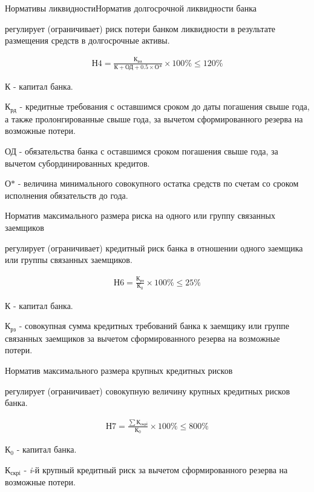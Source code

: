 \documentclass[_Banking_p2.tex]{subfiles}
\begin{document}
\begin{frame}[shrink=15]{Нормативы ликвидности}{Норматив долгосрочной ликвидности банка}
\begin{block}
\quad
регулирует (ограничивает) риск потери банком ликвидности в результате размещения средств в долгосрочные активы.
\end{block}
\begin{align}
\text{Н4}=\frac{\text{К}_\text{рд}}{\text{К}+\text{ОД}+	0.5\times \text{О*}}\times 100\%\leq 120\%
\end{align}

$\text{К}$ - капитал банка.

$\text{К}_\text{рд}$ - кредитные требования с оставшимся сроком до даты погашения свыше года, а также пролонгированные свыше года, за вычетом сформированного резерва на возможные потери.

$\text{ОД}$ - обязательства банка с оставшимся сроком погашения свыше года, за вычетом субординированных кредитов.

$\text{О*}$ - величина минимального совокупного остатка средств по счетам со сроком исполнения обязательств до года.
\end{frame}

\begin{frame}[shrink=15]{\setfontsize{14pt} Норматив максимального размера риска на одного или группу связанных заемщиков}
\begin{block}
\quad
регулирует (ограничивает) кредитный риск банка в отношении одного заемщика или группы связанных заемщиков.
\end{block}
\begin{align}
\text{Н6}=\frac{\text{К}_\text{рз}}{\text{К}_0}\times 100\%\leq 25\%
\end{align}

$\text{К}$ - капитал банка.

$\text{К}_\text{рз}$ - совокупная сумма кредитных требований банка к заемщику или группе связанных заемщиков за вычетом сформированного резерва на возможные потери.
\end{frame}

\begin{frame}{Норматив максимального размера крупных кредитных рисков}
\begin{block}
\quad
регулирует (ограничивает) совокупную величину крупных кредитных рисков банка. 
\end{block}
\begin{align}
\text{Н7}=\frac{\sum \text{К}_\text{скрi}}{\text{К}_0}\times 100\%\leq 800\%\end{align}

$\text{К}_0$ - капитал банка.

$\text{К}_\text{скрi}$ - \textit{i}-й крупный кредитный риск за вычетом сформированного резерва на возможные потери.
\end{frame}
\end{document}
